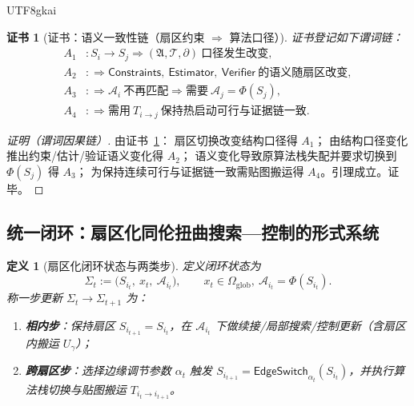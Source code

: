 \documentclass[12pt]{article}
\newtheorem{definition}{定义}[section]
\newtheorem{Certificate}{证书}[section]
\begin{document}
\begin{CJK*}{UTF8}{gkai}
\begin{Certificate}[证书：语义一致性链（扇区约束 $\Rightarrow$ 算法口径）]
\label{cert:sector-switch-implies-stack-switch-and-transport}
证书登记如下谓词链：
\[
\begin{aligned}
  A_1 &: S_i\to S_j\Rightarrow (\mathfrak{A},\mathcal{T},\partial)\ \text{口径发生改变},\\
  A_2 &: \Rightarrow \mathsf{Constraints},\ \mathsf{Estimator},\ \mathsf{Verifier}\ \text{的语义随扇区改变},\\
  A_3 &: \Rightarrow \mathcal{A}_i\ \text{不再匹配}\Rightarrow \text{需要}\ \mathcal{A}_j=\Phi(S_j),\\
  A_4 &: \Rightarrow \text{需用}\ T_{i\to j}\ \text{保持热启动可行与证据链一致}.
\end{aligned}
\]
\end{Certificate}

\begin{proof}[证明（谓词因果链）]
由证书~\ref{cert:sector-switch-implies-stack-switch-and-transport}：
扇区切换改变结构口径得 $A_1$；
由结构口径变化推出约束/估计/验证语义变化得 $A_2$；
语义变化导致原算法栈失配并要求切换到 $\Phi(S_j)$ 得 $A_3$；
为保持连续可行与证据链一致需贴图搬运得 $A_4$。引理成立。证毕。
\end{proof}

\subsection{统一闭环：扇区化同伦扭曲搜索—控制的形式系统}
\label{sec:sectorized-twisted-search-control-loop}

\begin{definition}[扇区化闭环状态与两类步]
定义闭环状态为
\[
  \Sigma_t := \bigl(S_{i_t},\ x_t,\ \mathcal{A}_{i_t}\bigr),
  \qquad x_t\in\Omega_{\mathrm{glob}},\ \mathcal{A}_{i_t}=\Phi(S_{i_t}).
\]
称一步更新 $\Sigma_t\to\Sigma_{t+1}$ 为：
\begin{enumerate}
  \item \textbf{相内步}：保持扇区 $S_{i_{t+1}}=S_{i_t}$，在 $\mathcal{A}_{i_t}$ 下做续接/局部搜索/控制更新（含扇区内搬运 $U_\gamma$）；
  \item \textbf{跨扇区步}：选择边缘调节参数 $\alpha_t$ 触发 $S_{i_{t+1}}=\mathsf{EdgeSwitch}_{\alpha_t}(S_{i_t})$，并执行算法栈切换与贴图搬运
    $T_{i_t\to i_{t+1}}$。
\end{enumerate}
\end{definition}


\end{CJK*}
\end{document}
